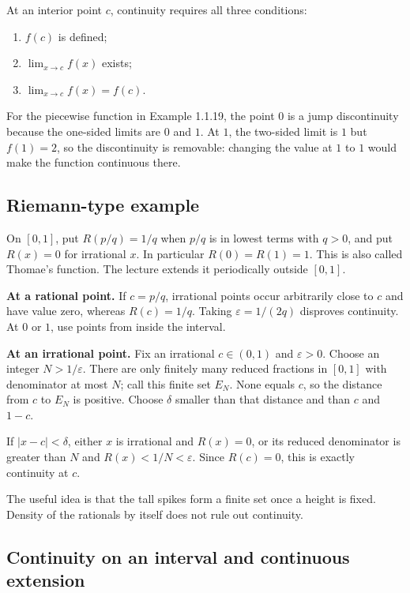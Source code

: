 \documentclass[11pt,a4paper]{article}
\begin{document}
At an interior point \(c\), continuity requires all three conditions:

\begin{enumerate}
\def\labelenumi{\arabic{enumi}.}
\item
  \(f(c)\) is defined;
\item
  \(\lim_{x\to c}f(x)\) exists;
\item
  \(\lim_{x\to c}f(x)=f(c)\).
\end{enumerate}

For the piecewise function in Example 1.1.19, the point \(0\) is a jump
discontinuity because the one-sided limits are \(0\) and \(1\). At
\(1\), the two-sided limit is \(1\) but \(f(1)=2\), so the discontinuity
is removable: changing the value at \(1\) to \(1\) would make the
function continuous there.

\subsection{Riemann-type example}\label{riemann-type-example}

On \([0,1]\), put \(R(p/q)=1/q\) when \(p/q\) is in lowest terms with
\(q>0\), and put \(R(x)=0\) for irrational \(x\). In particular
\(R(0)=R(1)=1\). This is also called Thomae's function. The lecture
extends it periodically outside \([0,1]\).

\textbf{At a rational point.} If \(c=p/q\), irrational points occur
arbitrarily close to \(c\) and have value zero, whereas \(R(c)=1/q\).
Taking \(\varepsilon=1/(2q)\) disproves continuity. At \(0\) or \(1\),
use points from inside the interval.

\textbf{At an irrational point.} Fix an irrational \(c\in(0,1)\) and
\(\varepsilon>0\). Choose an integer \(N>1/\varepsilon\). There are only
finitely many reduced fractions in \([0,1]\) with denominator at most
\(N\); call this finite set \(E_N\). None equals \(c\), so the distance
from \(c\) to \(E_N\) is positive. Choose \(\delta\) smaller than that
distance and than \(c\) and \(1-c\).

If \(|x-c|<\delta\), either \(x\) is irrational and \(R(x)=0\), or its
reduced denominator is greater than \(N\) and \(R(x)<1/N<\varepsilon\).
Since \(R(c)=0\), this is exactly continuity at \(c\).

The useful idea is that the tall spikes form a finite set once a height
is fixed. Density of the rationals by itself does not rule out
continuity.

\subsection{Continuity on an interval and continuous
extension}\label{continuity-on-an-interval-and-continuous-extension}
\end{document}
